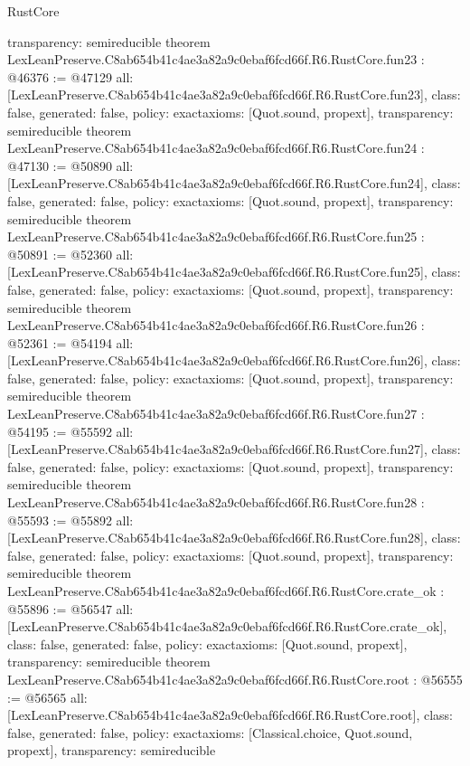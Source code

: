 \begin{lexlean}{RustCore}
\begin{coremodule}
{  transparency: semireducible
}
theorem LexLeanPreserve.C8ab654b41c4ae3a82a9c0ebaf6fcd66f.R6.RustCore.fun23 : @46376 := @47129 {
  all: [LexLeanPreserve.C8ab654b41c4ae3a82a9c0ebaf6fcd66f.R6.RustCore.fun23],
  class: false,
  generated: false,
  policy: exact{axioms: [Quot.sound, propext]},
  transparency: semireducible
}
theorem LexLeanPreserve.C8ab654b41c4ae3a82a9c0ebaf6fcd66f.R6.RustCore.fun24 : @47130 := @50890 {
  all: [LexLeanPreserve.C8ab654b41c4ae3a82a9c0ebaf6fcd66f.R6.RustCore.fun24],
  class: false,
  generated: false,
  policy: exact{axioms: [Quot.sound, propext]},
  transparency: semireducible
}
theorem LexLeanPreserve.C8ab654b41c4ae3a82a9c0ebaf6fcd66f.R6.RustCore.fun25 : @50891 := @52360 {
  all: [LexLeanPreserve.C8ab654b41c4ae3a82a9c0ebaf6fcd66f.R6.RustCore.fun25],
  class: false,
  generated: false,
  policy: exact{axioms: [Quot.sound, propext]},
  transparency: semireducible
}
theorem LexLeanPreserve.C8ab654b41c4ae3a82a9c0ebaf6fcd66f.R6.RustCore.fun26 : @52361 := @54194 {
  all: [LexLeanPreserve.C8ab654b41c4ae3a82a9c0ebaf6fcd66f.R6.RustCore.fun26],
  class: false,
  generated: false,
  policy: exact{axioms: [Quot.sound, propext]},
  transparency: semireducible
}
theorem LexLeanPreserve.C8ab654b41c4ae3a82a9c0ebaf6fcd66f.R6.RustCore.fun27 : @54195 := @55592 {
  all: [LexLeanPreserve.C8ab654b41c4ae3a82a9c0ebaf6fcd66f.R6.RustCore.fun27],
  class: false,
  generated: false,
  policy: exact{axioms: [Quot.sound, propext]},
  transparency: semireducible
}
theorem LexLeanPreserve.C8ab654b41c4ae3a82a9c0ebaf6fcd66f.R6.RustCore.fun28 : @55593 := @55892 {
  all: [LexLeanPreserve.C8ab654b41c4ae3a82a9c0ebaf6fcd66f.R6.RustCore.fun28],
  class: false,
  generated: false,
  policy: exact{axioms: [Quot.sound, propext]},
  transparency: semireducible
}
theorem LexLeanPreserve.C8ab654b41c4ae3a82a9c0ebaf6fcd66f.R6.RustCore.crate_ok : @55896 := @56547 {
  all: [LexLeanPreserve.C8ab654b41c4ae3a82a9c0ebaf6fcd66f.R6.RustCore.crate_ok],
  class: false,
  generated: false,
  policy: exact{axioms: [Quot.sound, propext]},
  transparency: semireducible
}
theorem LexLeanPreserve.C8ab654b41c4ae3a82a9c0ebaf6fcd66f.R6.RustCore.root : @56555 := @56565 {
  all: [LexLeanPreserve.C8ab654b41c4ae3a82a9c0ebaf6fcd66f.R6.RustCore.root],
  class: false,
  generated: false,
  policy: exact{axioms: [Classical.choice, Quot.sound, propext]},
  transparency: semireducible
}


\end{coremodule}
\end{lexlean}
